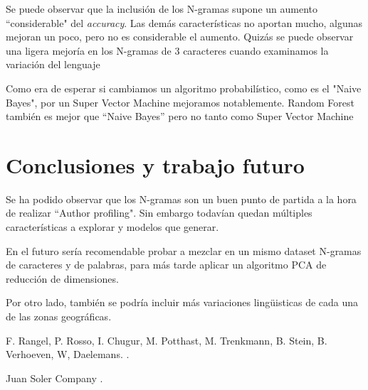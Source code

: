 \documentclass[11pt,a4paper]{article}
\begin{document}
Se puede observar que la inclusión de los N-gramas supone un aumento ``considerable" del \emph{accuracy}. Las demás características no aportan mucho, algunas mejoran un poco, pero no es considerable el aumento. Quizás se puede observar una ligera mejoría en los N-gramas de 3 caracteres cuando examinamos la variación del lenguaje

Como era de esperar si cambiamos un algoritmo probabilístico, como es el "Naive Bayes", por un Super Vector Machine mejoramos notablemente. Random Forest también es mejor que ``Naive Bayes'' pero no tanto como Super Vector Machine

\section{Conclusiones y trabajo futuro}

Se ha podido observar que los N-gramas son un buen punto de partida a la hora de realizar ``Author profiling". Sin embargo todavían quedan múltiples características a explorar y modelos que generar.

En el futuro sería recomendable probar a mezclar en un mismo dataset N-gramas de caracteres y de palabras, para más tarde aplicar un algoritmo PCA de reducción de dimensiones.

Por otro lado, también se podría incluir más variaciones lingüisticas de cada una de las zonas geográficas.


\begin{thebibliography}{}

F. Rangel, P. Rosso, I. Chugur, M. Potthast, M. Trenkmann, B. Stein, B. Verhoeven, W, Daelemans.
.

Juan Soler Company
.

\end{thebibliography}
\end{document}
